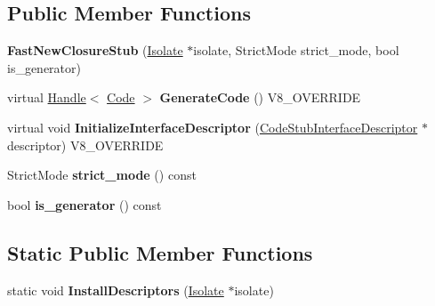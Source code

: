 \subsection*{Public Member Functions}
\begin{DoxyCompactItemize}
\item 
\hypertarget{classv8_1_1internal_1_1_fast_new_closure_stub_a0e0270e0b99ecd630006e2011632c1dc}{}{\bfseries Fast\+New\+Closure\+Stub} (\hyperlink{classv8_1_1internal_1_1_isolate}{Isolate} $\ast$isolate, Strict\+Mode strict\+\_\+mode, bool is\+\_\+generator)\label{classv8_1_1internal_1_1_fast_new_closure_stub_a0e0270e0b99ecd630006e2011632c1dc}

\item 
\hypertarget{classv8_1_1internal_1_1_fast_new_closure_stub_a4017004f39fd3dea997434ac0b26f3a3}{}virtual \hyperlink{classv8_1_1internal_1_1_handle}{Handle}$<$ \hyperlink{classv8_1_1internal_1_1_code}{Code} $>$ {\bfseries Generate\+Code} () V8\+\_\+\+O\+V\+E\+R\+R\+I\+D\+E\label{classv8_1_1internal_1_1_fast_new_closure_stub_a4017004f39fd3dea997434ac0b26f3a3}

\item 
\hypertarget{classv8_1_1internal_1_1_fast_new_closure_stub_aa2b88726e4629503e2888c5036225aec}{}virtual void {\bfseries Initialize\+Interface\+Descriptor} (\hyperlink{classv8_1_1internal_1_1_code_stub_interface_descriptor}{Code\+Stub\+Interface\+Descriptor} $\ast$descriptor) V8\+\_\+\+O\+V\+E\+R\+R\+I\+D\+E\label{classv8_1_1internal_1_1_fast_new_closure_stub_aa2b88726e4629503e2888c5036225aec}

\item 
\hypertarget{classv8_1_1internal_1_1_fast_new_closure_stub_a6f34fd7c66de2d7723d96904475d8473}{}Strict\+Mode {\bfseries strict\+\_\+mode} () const \label{classv8_1_1internal_1_1_fast_new_closure_stub_a6f34fd7c66de2d7723d96904475d8473}

\item 
\hypertarget{classv8_1_1internal_1_1_fast_new_closure_stub_a98fcbb3d45f512f97ff77510b900b745}{}bool {\bfseries is\+\_\+generator} () const \label{classv8_1_1internal_1_1_fast_new_closure_stub_a98fcbb3d45f512f97ff77510b900b745}

\end{DoxyCompactItemize}
\subsection*{Static Public Member Functions}
\begin{DoxyCompactItemize}
\item 
\hypertarget{classv8_1_1internal_1_1_fast_new_closure_stub_affde2643d37e042875f29d9f7a978dab}{}static void {\bfseries Install\+Descriptors} (\hyperlink{classv8_1_1internal_1_1_isolate}{Isolate} $\ast$isolate)\label{classv8_1_1internal_1_1_fast_new_closure_stub_affde2643d37e042875f29d9f7a978dab}

\end{DoxyCompactItemize}
